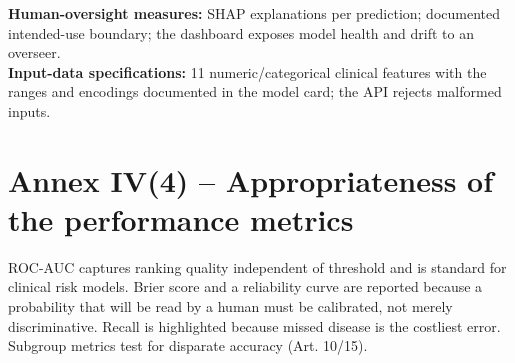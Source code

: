 \documentclass[11pt,a4paper]{article}
\begin{document}
\textbf{Human-oversight measures:} SHAP explanations per prediction; documented intended-use boundary; the dashboard exposes model health and drift to an overseer.\\

\textbf{Input-data specifications:} 11 numeric/categorical clinical features with the ranges and encodings documented in the model card; the API rejects malformed inputs.\\

\section*{Annex IV(4) -- Appropriateness of the performance metrics}
ROC-AUC captures ranking quality independent of threshold and is standard for clinical risk models. Brier score and a reliability curve are reported because a probability that will be read by a human must be calibrated, not merely discriminative. Recall is highlighted because missed disease is the costliest error. Subgroup metrics test for disparate accuracy (Art. 10/15).
\end{document}
